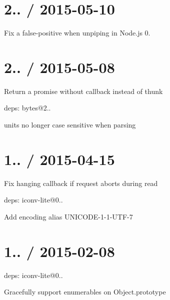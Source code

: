 \section*{2.. / 2015-\/05-\/10 }


\begin{DoxyItemize}
\item Fix a false-\/positive when unpiping in Node.\+js 0.
\end{DoxyItemize}

\section*{2.. / 2015-\/05-\/08 }


\begin{DoxyItemize}
\item Return a promise without callback instead of thunk
\item deps\+: bytes@2..
\begin{DoxyItemize}
\item units no longer case sensitive when parsing
\end{DoxyItemize}
\end{DoxyItemize}

\section*{1.. / 2015-\/04-\/15 }


\begin{DoxyItemize}
\item Fix hanging callback if request aborts during read
\item deps\+: iconv-\/lite@0..
\begin{DoxyItemize}
\item Add encoding alias U\+N\+I\+C\+O\+D\+E-\/1-\/1-\/\+U\+T\+F-\/7
\end{DoxyItemize}
\end{DoxyItemize}

\section*{1.. / 2015-\/02-\/08 }


\begin{DoxyItemize}
\item deps\+: iconv-\/lite@0..
\begin{DoxyItemize}
\item Gracefully support enumerables on {\ttfamily Object.\+prototype}
\end{DoxyItemize}
\end{DoxyItemize}

